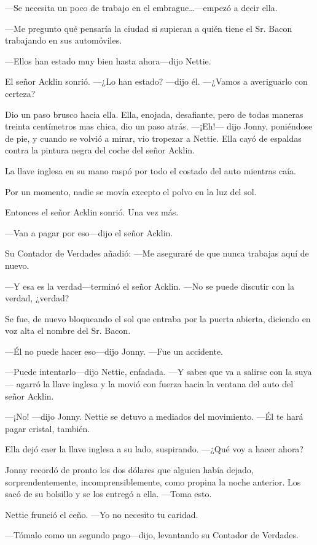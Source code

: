 ---Se necesita un poco de trabajo en el embrague\ldots{}---empezó a
decir ella.

---Me pregunto qué pensaría la ciudad si supieran a quién tiene el Sr.
Bacon trabajando en sus automóviles.

---Ellos han estado muy bien hasta ahora---dijo Nettie.

El señor Acklin sonrió. ---¿Lo han estado? ---dijo él. ---¿Vamos a
averiguarlo con certeza?

Dio un paso brusco hacia ella. Ella, enojada, desafiante, pero de todas
maneras treinta centímetros mas chica, dio un paso atrás. ---¡Eh!---
dijo Jonny, poniéndose de pie, y cuando se volvió a mirar, vio tropezar
a Nettie. Ella cayó de espaldas contra la pintura negra del coche del
señor Acklin.

La llave inglesa en su mano raspó por todo el costado del auto mientras
caía.

Por un momento, nadie se movía excepto el polvo en la luz del sol.

Entonces el señor Acklin sonrió. Una vez más.

---Van a pagar por eso---dijo el señor Acklin.

Su Contador de Verdades añadió: ---Me aseguraré de que nunca trabajas
aquí de nuevo.

---Y esa es la verdad---terminó el señor Acklin. ---No se puede discutir
con la verdad, ¿verdad?

Se fue, de nuevo bloqueando el sol que entraba por la puerta abierta,
diciendo en voz alta el nombre del Sr. Bacon.

---Él no puede hacer eso---dijo Jonny. ---Fue un accidente.

---Puede intentarlo---dijo Nettie, enfadada. ---Y sabes que va a salirse
con la suya--- agarró la llave inglesa y la movió con fuerza hacia la
ventana del auto del señor Acklin.

---¡No! ---dijo Jonny. Nettie se detuvo a mediados del movimiento. ---Él
te hará pagar cristal, también.

Ella dejó caer la llave inglesa a su lado, suspirando. ---¿Qué voy a
hacer ahora?

Jonny recordó de pronto los dos dólares que alguien había dejado,
sorprendentemente, incomprensiblemente, como propina la noche anterior.
Los sacó de su bolsillo y se los entregó a ella. ---Toma esto.

Nettie frunció el ceño. ---Yo no necesito tu caridad.

---Tómalo como un segundo pago---dijo, levantando su Contador de
Verdades.

